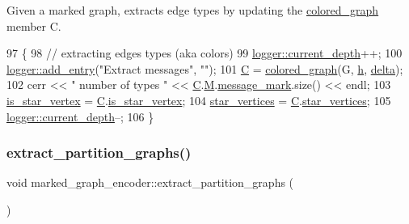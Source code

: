 Given a marked graph, extracts edge types by updating the \hyperlink{classcolored__graph}{colored\+\_\+graph} member C. 


\begin{DoxyCode}
97 \{
98   \textcolor{comment}{// extracting edges types (aka colors)}
99   \hyperlink{classlogger_a9d29b49bd318a719a8e85b59eac54fe0}{logger::current\_depth}++;
100   \hyperlink{classlogger_a710163deb17bc81f70d53d285b8ac9ac}{logger::add\_entry}(\textcolor{stringliteral}{"Extract messages"}, \textcolor{stringliteral}{""});
101   \hyperlink{classmarked__graph__encoder_af82bc0653414091291cb75553a407bdb}{C} = \hyperlink{classcolored__graph}{colored\_graph}(G, \hyperlink{classmarked__graph__encoder_ae7f8872c57d2d64e4ca6cc47387b9b58}{h}, \hyperlink{classmarked__graph__encoder_a29dcf42526b12cf7964a556bb1025c9b}{delta});
102   cerr << \textcolor{stringliteral}{" number of types "} << \hyperlink{classmarked__graph__encoder_af82bc0653414091291cb75553a407bdb}{C}.\hyperlink{classcolored__graph_ab72c568fe12f7c849ca6bffb145aec47}{M}.\hyperlink{classgraph__message_a49d9af5150daf0599c29fe18cb032fa5}{message\_mark}.size() << endl;
103   \hyperlink{classmarked__graph__encoder_ac36f6c2430af6fa4d20584569859bb59}{is\_star\_vertex} = \hyperlink{classmarked__graph__encoder_af82bc0653414091291cb75553a407bdb}{C}.\hyperlink{classcolored__graph_ad41163e970530c7e45878d299f0dc961}{is\_star\_vertex};
104   \hyperlink{classmarked__graph__encoder_a08fdf6fcd7dcd8c5d1667f2d7ff06c2c}{star\_vertices} = \hyperlink{classmarked__graph__encoder_af82bc0653414091291cb75553a407bdb}{C}.\hyperlink{classcolored__graph_ab7ee8d717abde7ad7467ef695038f574}{star\_vertices};
105   \hyperlink{classlogger_a9d29b49bd318a719a8e85b59eac54fe0}{logger::current\_depth}--;
106 \}
\end{DoxyCode}
\mbox{\label{classmarked__graph__encoder_a60b0038c57bd8fa2f5cb3f0b6999c4f3}} 
\subsubsection{\texorpdfstring{extract\+\_\+partition\+\_\+graphs()}{extract\_partition\_graphs()}}
{\footnotesize\ttfamily void marked\+\_\+graph\+\_\+encoder\+::extract\+\_\+partition\+\_\+graphs (\begin{DoxyParamCaption}{ }\end{DoxyParamCaption})\hspace{0.3cm}{\ttfamily [private]}}



